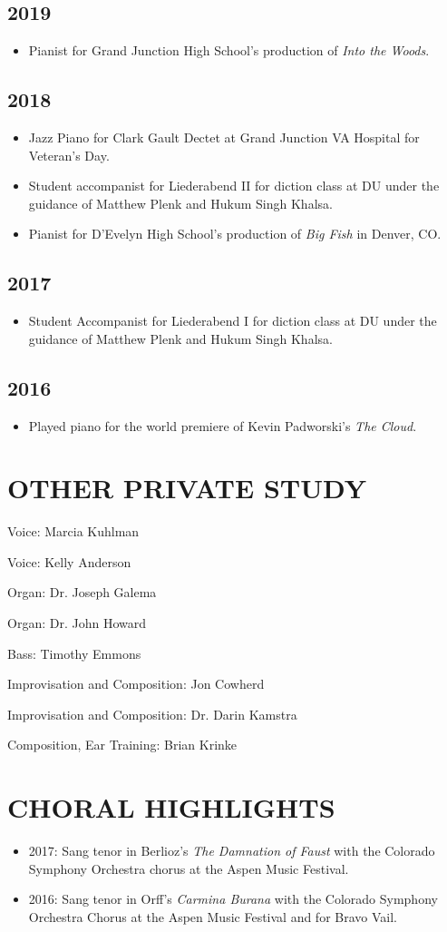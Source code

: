 \documentclass{article}
\newcommand{\cvItem}[1]{
        \item {
            {#1}
        }
    }
\newcommand{\cvItemListStart}{\begin{itemize}[leftmargin=10pt]}
\newcommand{\cvItemListEnd}{\end{itemize}}
\begin{document}
        \subsection{2019}
            \cvItemListStart
                \cvItem{Pianist for Grand Junction High School's production of {\em Into the
                Woods}.}
            \cvItemListEnd
        \subsection{2018}
            \cvItemListStart
                \cvItem{Jazz Piano for Clark Gault Dectet at Grand Junction VA Hospital for
                Veteran's Day.}
                \cvItem{Student accompanist for Liederabend II for diction class at DU under the guidance
                of Matthew Plenk and Hukum Singh Khalsa.}
                \cvItem{Pianist for D'Evelyn High School's production of {\em Big Fish} in Denver, CO.}
            \cvItemListEnd
        \subsection{2017}
            \cvItemListStart
                \cvItem{Student Accompanist for Liederabend I for diction class at DU under the guidance
                of Matthew Plenk and Hukum Singh Khalsa.}
            \cvItemListEnd
        \subsection{2016}
            \cvItemListStart
                \cvItem{Played piano for the world premiere of Kevin Padworski's {\em The Cloud}.}
            \cvItemListEnd
        \newpage

    \section{OTHER PRIVATE STUDY}
        \cvItemListStart
            \begin{multicols}{2}
                \cvItem{Voice: Marcia Kuhlman}
                \cvItem{Voice: Kelly Anderson}
                \cvItem{Organ: Dr. Joseph Galema}
                \cvItem{Organ: Dr. John Howard}
                \cvItem{Bass: Timothy Emmons}
                \cvItem{Improvisation and Composition: Jon Cowherd}
                \cvItem{Improvisation and Composition: Dr. Darin Kamstra}
                \cvItem{Composition, Ear Training: Brian Krinke}
            \end{multicols}
        \cvItemListEnd
    \section{CHORAL HIGHLIGHTS}
       \cvItemListStart
           \cvItem{2017: Sang tenor in Berlioz's {\em The Damnation of Faust} with the Colorado
           Symphony Orchestra chorus at the Aspen Music Festival.}
           \cvItem{2016: Sang tenor in Orff's {\em Carmina Burana} with the Colorado Symphony
           Orchestra Chorus at the Aspen Music Festival and for Bravo Vail.}
        \cvItemListEnd
\end{document}
